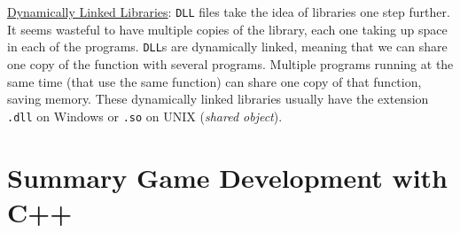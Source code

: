 \underline{Dynamically Linked Libraries}: \verb|DLL| files take the idea of libraries one step further. It seems wasteful to have multiple copies of the library, each one taking up space in each of the programs. \verb|DLL|s are dynamically linked, meaning that we can share one copy of the function with several programs. Multiple programs running at the same time (that use the same function) can share one copy of that function, saving memory. These dynamically linked libraries usually have the extension \verb|.dll| on Windows or \verb|.so| on UNIX (\textit{shared object}).




\newpage
\section{Summary Game Development with C++}

